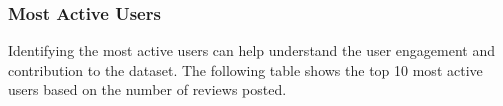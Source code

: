 \documentclass{article}
\begin{document}

\subsubsection{Most Active Users}

Identifying the most active users can help understand the user engagement and contribution to the dataset. The following table shows the top 10 most active users based on the number of reviews posted.
\end{document}
